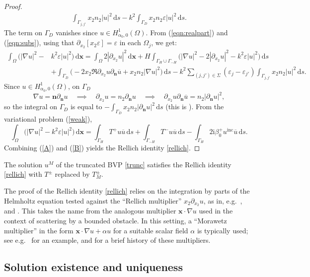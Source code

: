 \documentclass[a4paper,10pt]{article}
\newcommand{\bx}{{\mathbf x}}
\newcommand{\bn}{{\mathbf n}}
\newcommand{\ri}{{\mathrm i}}
\newcommand{\rd}{{\,\mathrm d}}
\newcommand{\inc}{{\mathrm{inc}}}
\newcommand{\dn}{{\partial_\bn}}
\newcommand{\dxt}{{\partial_{x_2}}}
\newcommand{\cu}{{\overline{u}}}
\newcommand{\GD}{{\Gamma_D}}
\newcommand{\GH}{{\Gamma_H}}
\newcommand{\GmH}{{\Gamma_{-H}}}
\begin{document}
\begin{proof}
\begin{align}
{		\int_{\Gamma_{j,j'}}} x_2 n_2 |u|^2\rd s
	-k^2\int_\GD x_2n_2\varepsilon|u|^2\rd s.
\end{align}
The term on $\GD$ vanishes since $u\in H^1_{\alpha_0,0}(\Omega)$.
From (\ref{eqn:realpart}) and (\ref{eqn:subs}), {using that $\dxt [x_2 \varepsilon]=\varepsilon$ in each $\Omega_j$,} we get:
\begin{align}\label{A} 
	\int_\Omega \big( |\nabla u|^2 - &k^2\varepsilon{|u|^2}\big)\rd\bx
	= \int_\Omega 2 \left| \dxt u \right|^2\rd\bx
	+ H \int_{{\GH\cup\GmH}} \biggl( |\nabla u|^2 - 2 \left| \dxt u \right|^2 -k^2\varepsilon |u|^2 \biggr){\rd s} \\ \nonumber
	&+\int_{\GD}\biggl(-2x_2\Re\dxt u\dn \cu
	+x_2n_2|\nabla u|^2\biggr) \rd s
	-  k^2\sum_{(j,j')\in\Sigma} ( \varepsilon_{j} -\varepsilon_{j'} ) \int_{\Gamma_{j,j'}} x_2 n_2 |u|^2 \rd s.
\end{align}
Since $u\in H^1_{\alpha_0,0}(\Omega)$, on $\GD$
$$
\nabla u = \bn \dn u  \quad\implies\quad
\dxt u =n_2 \dn u \quad\implies\quad
\dxt u\dn \cu =n_2 |\dn u |^2,
$$
so the integral on $\GD$ is equal to $-\int_\GD x_2n_2|\dn u|^2\rd s$ (this is \cite[eq.~(3.38)]{BonnetBD1994}).
From the variational problem (\ref{weak}),
\begin{equation} \label{B}
	\int_\Omega \big(|\nabla u|^2 - k^2\varepsilon {|u|^2}\big) \rd\bx
	= \int_{\GH} T^+ u \cu\rd s +\int_\GmH T^- u \cu \rd s
	- \int_{\GH} 2 \ri \beta_0^+ u^\inc \cu\rd s.
\end{equation}
Combining (\ref{A}) and (\ref{B}) yields the Rellich identity \eqref{rellich}.
\end{proof}

The solution $u^M$ of the truncated BVP \eqref{trunc} satisfies the Rellich identity \eqref{rellich} with $T^\pm$ replaced by $T^\pm_M$.

The proof of the Rellich identity \eqref{rellich} relies on the integration by parts of the Helmholtz equation tested against the ``Rellich multiplier'' $x_2\partial_{x_2}u$, as in, e.g.\ \cite[Theorem~3.5]{BonnetBD1994}, \cite[Lemma~3.2]{Lechleiter2010} and \cite[Lemma~1]{Civiletti2020}.
This takes the name from the analogous multiplier $\bx\cdot\nabla u$ used in the context of scattering by a bounded obstacle.
In this setting, a ``Morawetz multiplier'' in the form $\bx\cdot\nabla u+\alpha u$ for a suitable scalar field $\alpha$ is typically used; see e.g.\ \cite[Lemma~3.5]{CWM08} for an example, and \cite[Remark~4.2]{MS17} for a brief history of these multipliers.


\subsection{Solution existence and uniqueness}
\end{document}
